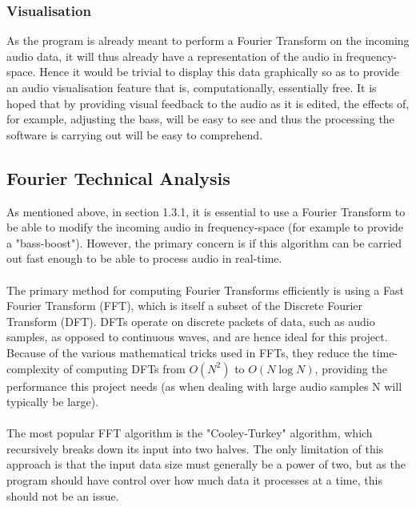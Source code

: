 \subsubsection{Visualisation}
As the program is already meant to perform a Fourier Transform on the incoming audio data, it will thus already have a representation of the audio in frequency-space. Hence it would be trivial to display this data graphically so as to provide an audio visualisation feature that is, computationally, essentially free. It is hoped that by providing visual feedback to the audio as it is edited, the effects of, for example, adjusting the bass, will be easy to see and thus the processing the software is carrying out will be easy to comprehend.

\pagebreak
\subsection{Fourier Technical Analysis}
As mentioned above, in section 1.3.1, it is essential to use a Fourier Transform to be able to modify the incoming audio in frequency-space (for example to provide a "bass-boost"). However, the primary concern is if this algorithm can be carried out fast enough to be able to process audio in real-time.

\paragraph{}
The primary method for computing Fourier Transforms efficiently is using a Fast Fourier Transform (FFT), which is itself a subset of the Discrete Fourier Transform (DFT). DFTs operate on discrete packets of data, such as audio samples, as opposed to continuous waves, and are hence ideal for this project. Because of the various mathematical tricks used in FFTs, they reduce the time-complexity of computing DFTs from \(O(N^2)\) to \(O(N\log{N})\), providing the performance this project needs (as when dealing with large audio samples N will typically be large).

\paragraph{}
The most popular FFT algorithm is the "Cooley-Turkey" algorithm, which recursively breaks down its input into two halves. The only limitation of  this approach is that the input data size must generally be a power of two, but as the program should have control over how much data it processes at a time, this should not be an issue.

